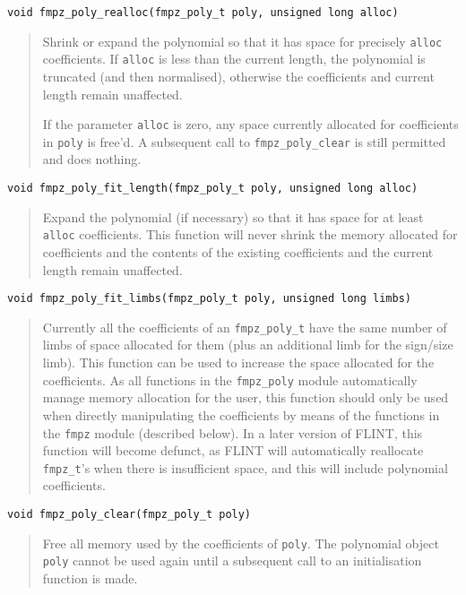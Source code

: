 \documentclass[a4paper,10pt]{article}
\newcommand{\code}{\lstinline}
\begin{document}
\begin{lstlisting}
void fmpz_poly_realloc(fmpz_poly_t poly, unsigned long alloc)
\end{lstlisting}
\begin{quote}
Shrink or expand the polynomial so that it has space for precisely \code{alloc} coefficients. If \code{alloc} is less than the current length, the polynomial is truncated (and then normalised), otherwise the coefficients and current length remain unaffected. 

If the parameter \code{alloc} is zero, any space currently allocated for coefficients in \code{poly} is free'd. A subsequent call to \code{fmpz_poly_clear} is still permitted and does nothing.
\end{quote}

\begin{lstlisting}
void fmpz_poly_fit_length(fmpz_poly_t poly, unsigned long alloc)
\end{lstlisting}
\begin{quote}
Expand the polynomial (if necessary) so that it has space for at least \code{alloc} coefficients. This function will never shrink the memory allocated for coefficients and the contents of the existing coefficients and the current length remain unaffected. 
\end{quote}

\begin{lstlisting}
void fmpz_poly_fit_limbs(fmpz_poly_t poly, unsigned long limbs)
\end{lstlisting}
\begin{quote}
Currently all the coefficients of an \code{fmpz_poly_t} have the same number of limbs of space allocated for them (plus an additional limb for the sign/size limb). This function can be used to increase the space allocated for the coefficients. As all functions in the \code{fmpz_poly} module automatically manage memory allocation for the user, this function should only be used when directly manipulating the coefficients by means of the functions in the \code{fmpz} module (described below). In a later version of FLINT, this function will become defunct, as FLINT will automatically reallocate \code{fmpz_t}'s when there is insufficient space, and this will include polynomial coefficients.
\end{quote}

\begin{lstlisting}
void fmpz_poly_clear(fmpz_poly_t poly)\end{lstlisting}
\begin{quote}
Free all memory used by the coefficients of \code{poly}. The polynomial object \code{poly} cannot be used again until a subsequent call to an initialisation function is made.
\end{quote}
\end{document}
